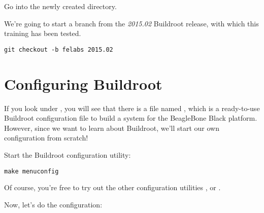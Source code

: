 Go into the newly created  directory.

We're going to start a branch from the {\em 2015.02} Buildroot
release, with which this training has been tested.

\begin{verbatim}
git checkout -b felabs 2015.02
\end{verbatim}

\section{Configuring Buildroot}

If you look under , you will see that there is a file
named , which is a ready-to-use Buildroot
configuration file to build a system for the BeagleBone Black
platform. However, since we want to learn about Buildroot, we'll start
our own configuration from scratch!

Start the Buildroot configuration utility:

\begin{verbatim}
make menuconfig
\end{verbatim}

Of course, you're free to try out the other configuration utilities
,  or .

Now, let's do the configuration:

